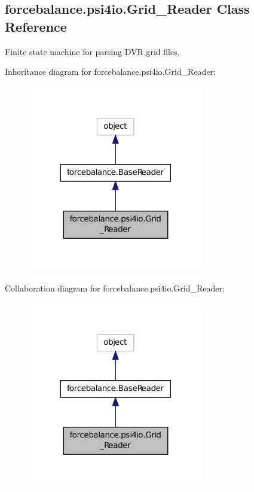 \hypertarget{classforcebalance_1_1psi4io_1_1Grid__Reader}{\subsection{forcebalance.\-psi4io.\-Grid\-\_\-\-Reader Class Reference}
\label{classforcebalance_1_1psi4io_1_1Grid__Reader}
}


Finite state machine for parsing D\-V\-R grid files.  




Inheritance diagram for forcebalance.\-psi4io.\-Grid\-\_\-\-Reader\-:
\nopagebreak
\begin{figure}[H]
\begin{center}
\leavevmode
\includegraphics[width=218pt]{classforcebalance_1_1psi4io_1_1Grid__Reader__inherit__graph}
\end{center}
\end{figure}


Collaboration diagram for forcebalance.\-psi4io.\-Grid\-\_\-\-Reader\-:
\nopagebreak
\begin{figure}[H]
\begin{center}
\leavevmode
\includegraphics[width=218pt]{classforcebalance_1_1psi4io_1_1Grid__Reader__coll__graph}
\end{center}
\end{figure}

